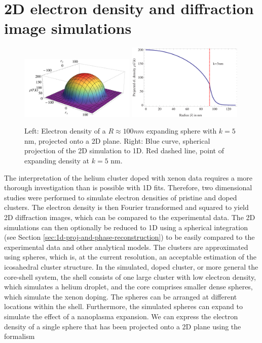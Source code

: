 \section{2D electron density and diffraction image simulations}\label{sec:2d-simulations}
\begin{figure}
	\centering
		\includegraphics[width=0.49\textwidth]{images/cluster-generation-2D.jpg}
		\includegraphics[width=0.49\textwidth]{images/cluster-generation-1D.png}
	\caption[Used electron densities in 2D real and Fourier space simulations.]{Left: Electron density of a $R\approx 100nm$ expanding sphere with $k=5$ nm, projected onto a 2D plane. Right: Blue curve, spherical projection of the 2D simulation to 1D. Red dashed line, point of expanding density at $k=5$ nm.}
	\label{fig:cluster-generation}
\end{figure}
The interpretation of the helium cluster doped with xenon data requires a more thorough investigation than is possible with 1D fits. Therefore, two dimensional studies were performed to simulate electron densities of pristine and doped clusters. The electron density is then Fourier transformed and squared to yield 2D diffraction images, which can be compared to the experimental data. The 2D simulations can then optionally be reduced to 1D using a spherical integration (see Section \ref{sec:1d-proj-and-phase-reconstruction}) to be easily compared to the experimental data and other analytical models. The clusters are approximated using spheres, which is, at the current resolution, an acceptable estimation of the icosahedral cluster structure. In the simulated, doped cluster, or more general the core-shell system, the shell consists of one large cluster with low electron density, which simulates a helium droplet, and the core comprises smaller dense spheres, which simulate the xenon doping. The spheres can be arranged at different locations within the shell. Furthermore, the simulated spheres can expand to simulate the effect of a nanoplasma expansion. We can express the electron density of a single sphere that has been projected onto a 2D plane using the formalism
